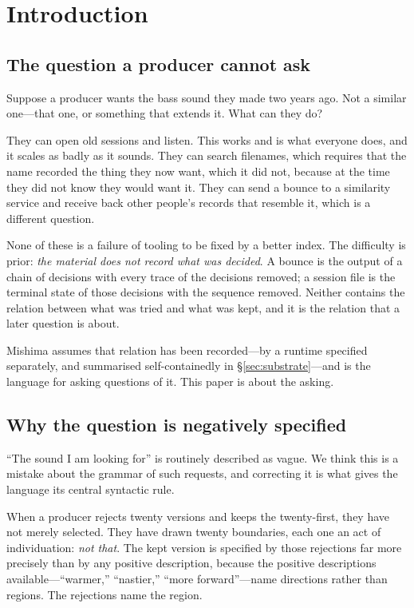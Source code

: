 \documentclass[11pt,twocolumn,a4paper]{article}
\theoremstyle{definition}
\theoremstyle{remark}
\begin{document}
\section{Introduction}
\label{sec:intro}

\subsection{The question a producer cannot ask}

Suppose a producer wants the bass sound they made two years ago. Not a similar
one---that one, or something that extends it. What can they do?

They can open old sessions and listen. This works and is what everyone does, and
it scales as badly as it sounds. They can search filenames, which requires that
the name recorded the thing they now want, which it did not, because at the time
they did not know they would want it. They can send a bounce to a similarity
service and receive back other people's records that resemble it, which is a
different question.

None of these is a failure of tooling to be fixed by a better index. The
difficulty is prior: \emph{the material does not record what was decided}. A
bounce is the output of a chain of decisions with every trace of the decisions
removed; a session file is the terminal state of those decisions with the
sequence removed. Neither contains the relation between what was tried and what
was kept, and it is the relation that a later question is about.

Mishima assumes that relation has been recorded---by a runtime specified
separately, and summarised self-containedly in \S\ref{sec:substrate}---and is the
language for asking questions of it. This paper is about the asking.

\subsection{Why the question is negatively specified}

``The sound I am looking for'' is routinely described as vague. We think this is
a mistake about the grammar of such requests, and correcting it is what gives the
language its central syntactic rule.

When a producer rejects twenty versions and keeps the twenty-first, they have not
merely selected. They have drawn twenty boundaries, each one an act of
individuation: \emph{not that}. The kept version is specified by those rejections
far more precisely than by any positive description, because the positive
descriptions available---``warmer,'' ``nastier,'' ``more forward''---name
directions rather than regions. The rejections name the region.
\end{document}
